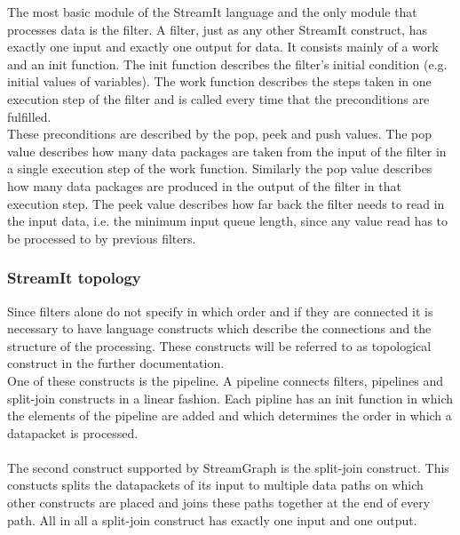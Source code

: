 \documentclass[journal]{IEEEtran}
\begin{document}
The most basic module of the StreamIt language and the only module that
processes data is the filter. A filter, just as any other StreamIt construct,
has exactly one input and exactly one output for data. It consists mainly of a
work and an init function. The init function describes the filter's initial
condition (e.g. initial values of variables). The work function describes the
steps taken in one execution step of the filter and is called every time that
the preconditions are fulfilled.\\

These preconditions are described by the pop, peek and push values. The pop
value describes how many data packages are taken from the input of the filter in
a single execution step of the work function. Similarly the pop value describes
how many data packages are produced in the output of the filter in that
execution step. The peek value describes how far back the filter needs to read
in the input data, i.e. the minimum input queue length, since any value read has
to be processed to by previous filters.


\subsubsection{StreamIt topology}
\label{StreamItTopology}
\noindent Since filters alone do not specify in which order and if they are
connected it is necessary to have language constructs which describe the
connections and the structure of the processing. These constructs will be
referred to as topological construct in the further documentation.\\

One of these constructs is the pipeline. A pipeline connects filters, pipelines
and split-join constructs in a linear fashion. Each pipline has an init function
in which the elements of the pipeline are added and which determines the order
in which a datapacket is processed.\\
\\

The second construct supported by StreamGraph is the split-join construct. This
constucts splits the datapackets of its input to multiple data paths on which
other constructs are placed and joins these paths together at the end of every
path. All in all a split-join construct has exactly one input and one output.\\
\\
\end{document}
